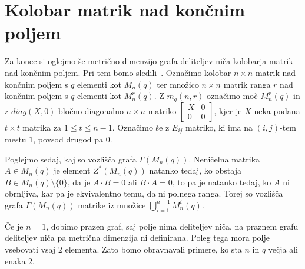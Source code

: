 \documentclass[mat1, tisk]{fmfdelo}
\newcommand{\N}{\mathbb N}
\begin{document}
\section{Kolobar matrik nad končnim poljem}
Za konec si oglejmo še metrično dimenzijo grafa deliteljev niča kolobarja matrik nad 
končnim poljem. Pri tem bomo sledili~\cite{0OuSh}. 
Označimo  
kolobar $n \times n$ matrik nad končnim poljem s $q$ elementi kot $M_n(q)$ ter  
množico $n \times n$ matrik ranga $r$ nad končnim poljem s $q$ elementi kot ${M}_n^r(q)$. Z $m_q(n,r)$  
označimo moč $M_n^r(q)$ in z $diag(X, 0)$ bločno diagonalno $n \times n$ matriko 
$\begin{bmatrix}
  X & 0 \\
  0 & 0
\end{bmatrix}$, kjer je $X$ neka podana $t \times t$ matrika za $1 \leq t \leq n-1$. 
Označimo še z $E_{ij}$ matriko, ki ima na $(i,j)$-tem mestu $1$, povsod drugod pa $0$.

Poglejmo sedaj, kaj so vozlišča grafa $\Gamma(M_n(q))$. 
Neničelna matrika $A\in M_n(q)$ je element $Z^*(M_n(q))$ natanko tedaj, ko obstaja 
$B \in M_n(q)\setminus\{0\}$, da je $A \cdot B = 0$ ali $B \cdot A = 0$, to pa je natanko tedaj, ko $A$ 
ni obrnljiva, kar pa je ekvivalentno temu, da ni polnega ranga. Torej so vozlišča grafa $\Gamma(M_n(q))$ 
matrike iz množice $\bigcup\limits_{i=1}^{n-1} M_n^i(q)$.

Če je $n = 1$, dobimo prazen graf, saj polje nima deliteljev niča, na praznem grafu deliteljev 
niča pa metrična dimenzija ni definirana. Poleg tega mora polje vsebovati vsaj $2$ elementa. 
Zato bomo obravnavali primere, ko sta $n$ in $q$ večja ali enaka $2$.
\end{document}
